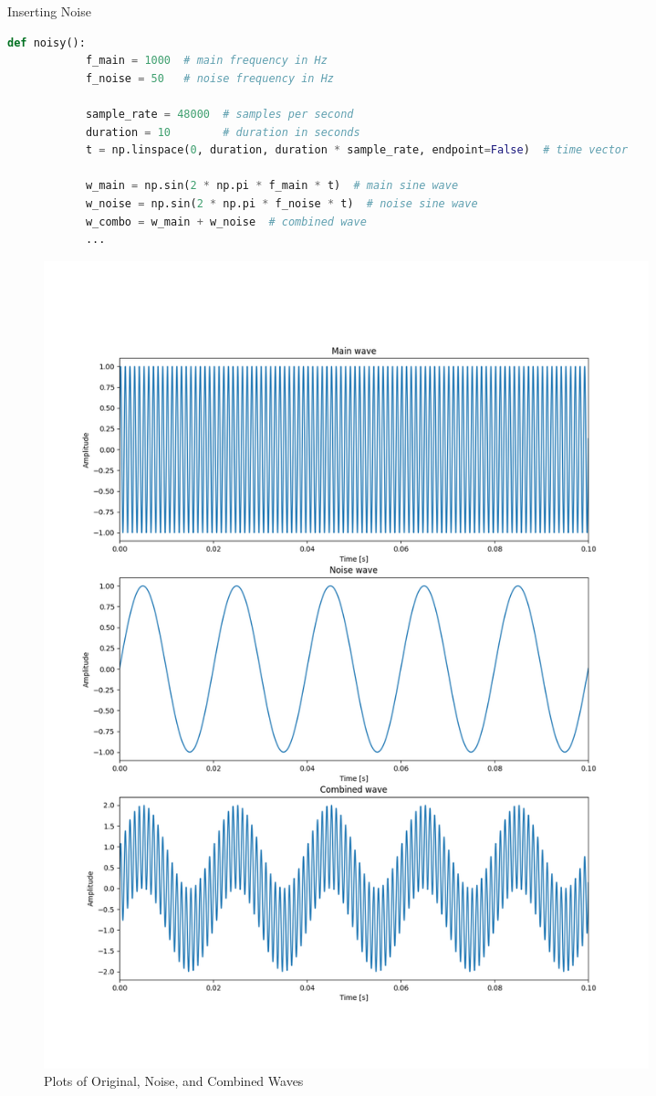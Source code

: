 \begin{hwkProblem}{6.1}{Inserting Noise}
	\solution

	\solpart

	\begin{lstlisting}[language=python]
		def noisy():
			f_main = 1000  # main frequency in Hz
			f_noise = 50   # noise frequency in Hz

			sample_rate = 48000  # samples per second
			duration = 10        # duration in seconds
			t = np.linspace(0, duration, duration * sample_rate, endpoint=False)  # time vector

			w_main = np.sin(2 * np.pi * f_main * t)  # main sine wave
			w_noise = np.sin(2 * np.pi * f_noise * t)  # noise sine wave
			w_combo = w_main + w_noise  # combined wave
			...
	\end{lstlisting}

	\newpage
	\solpart

	\begin{figure}[ht!]
	  \centering
	  \includegraphics[width=0.85\textwidth]{./6.1.2.png}
	  \caption{Plots of Original, Noise, and Combined Waves}
	\end{figure}


\end{hwkProblem}
